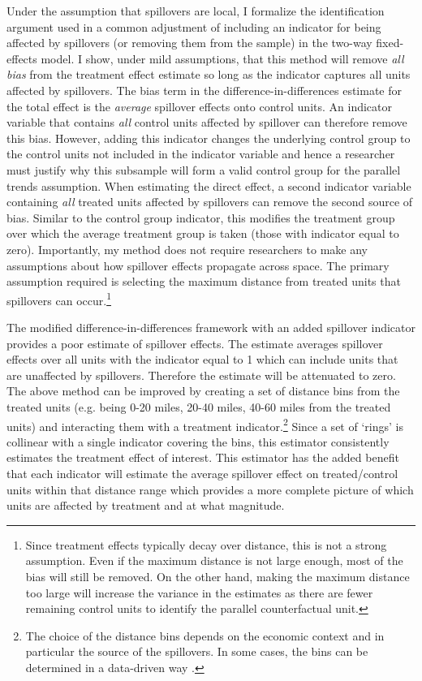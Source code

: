 \documentclass[11pt]{article}
\begin{document}
Under the assumption that spillovers are local, I formalize the identification argument used in a common adjustment of including an indicator for being affected by spillovers (or removing them from the sample) in the two-way fixed-effects model. I show, under mild assumptions, that this method will remove \emph{all bias} from the treatment effect estimate so long as the indicator captures all units affected by spillovers. The bias term in the difference-in-differences estimate for the total effect is the \textit{average} spillover effects onto control units. An indicator variable that contains \emph{all} control units affected by spillover can therefore remove this bias. However, adding this indicator changes the underlying control group to the control units not included in the indicator variable and hence a researcher must justify why this subsample will form a valid control group for the parallel trends assumption. When estimating the direct effect, a second indicator variable containing \emph{all} treated units affected by spillovers can remove the second source of bias. Similar to the control group indicator, this modifies the treatment group over which the average treatment group is taken (those with indicator equal to zero). Importantly, my method does not require researchers to make any assumptions about how spillover effects propagate across space. The primary assumption required is selecting the maximum distance from treated units that spillovers can occur.\footnote{Since treatment effects typically decay over distance, this is not a strong assumption. Even if the maximum distance is not large enough, most of the bias will still be removed. On the other hand, making the maximum distance too large will increase the variance in the estimates as there are fewer remaining control units to identify the parallel counterfactual unit.} 

The modified difference-in-differences framework with an added spillover indicator provides a poor estimate of spillover effects. The estimate averages spillover effects over all units with the indicator equal to 1 which can include units that are unaffected by spillovers. Therefore the estimate will be attenuated to zero. The above method can be improved by creating a set of distance bins from the treated units (e.g. being 0-20 miles, 20-40 miles, 40-60 miles from the treated units) and interacting them with a treatment indicator.\footnote{The choice of the distance bins depends on the economic context and in particular the source of the spillovers. In some cases, the bins can be determined in a data-driven way \citep{Butts_2021}.} Since a set of `rings' is collinear with a single indicator covering the bins, this estimator consistently estimates the treatment effect of interest. This estimator has the added benefit that each indicator will estimate the average spillover effect on treated/control units within that distance range which provides a more complete picture of which units are affected by treatment and at what magnitude. 
\end{document}

